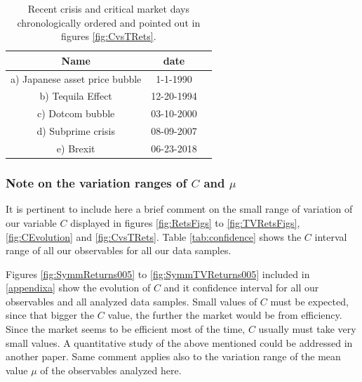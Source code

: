 \documentclass{elsarticle}
\begin{document}
\begin{table}[h!tb]
	\begin{center}
		\setlength\tabcolsep{3pt} %
		{\renewcommand{\arraystretch}{1.2}%
		\begin{tabular}{|c|c|c|}
			\hline
			Name&date\\
			\hline
			\hline
			a) Japanese asset price bubble& 1-1-1990\\
			\hline
			b) Tequila Effect& 12-20-1994\\
			\hline
			c) Dotcom bubble&03-10-2000\\
			\hline
			d) Subprime crisis&08-09-2007\\
			\hline
			e) Brexit&06-23-2018\\
			\hline
			\hline
		\end{tabular}
		}
	\caption[]{\small Recent crisis and critical market days chronologically ordered and pointed out in figures \ref{fig:CvsTRets}. }
	\label{tab:BigMovs}
	\end{center}
\end{table}


\subsubsection{Note on the variation ranges of $C$ and $\mu$}
It is pertinent to include here a brief comment on the small range of variation of our variable $C$ displayed in figures \ref{fig:RetsFigs} to \ref{fig:TVRetsFigs},  \ref{fig:CEvolution} and \ref{fig:CvsTRets}. Table \ref{tab:confidence} shows the $C$ interval range of all our observables for all our data samples.

Figures \ref{fig:SymmReturns005} to \ref{fig:SymmTVReturns005} included in \ref{appendixa} show the evolution of $C$ and it confidence interval for all our observables and all analyzed data samples. Small values of $C$ must be expected, since that bigger the $C$ value,  the further the market would be from efficiency. Since the market seems to be efficient most of the time, $C$ usually must take  very small values. A quantitative study of the above mentioned could be addressed in another paper. Same comment applies also to the variation range of the  mean value $\mu$ of the observables analyzed here.
\end{document}
